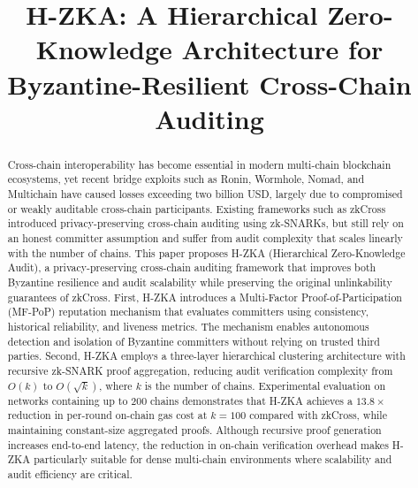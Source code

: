 \documentclass[journal]{IEEEtran}
\begin{document}
\title{H-ZKA: A Hierarchical Zero-Knowledge Architecture for Byzantine-Resilient Cross-Chain Auditing}



\maketitle

\begin{abstract}
Cross-chain interoperability has become essential in modern multi-chain blockchain ecosystems, yet recent bridge exploits such as Ronin, Wormhole, Nomad, and Multichain have caused losses exceeding two billion USD, largely due to compromised or weakly auditable cross-chain participants. Existing frameworks such as zkCross introduced privacy-preserving cross-chain auditing using zk-SNARKs, but still rely on an honest committer assumption and suffer from audit complexity that scales linearly with the number of chains. This paper proposes H-ZKA (Hierarchical Zero-Knowledge Audit), a privacy-preserving cross-chain auditing framework that improves both Byzantine resilience and audit scalability while preserving the original unlinkability guarantees of zkCross. First, H-ZKA introduces a Multi-Factor Proof-of-Participation (MF-PoP) reputation mechanism that evaluates committers using consistency, historical reliability, and liveness metrics. The mechanism enables autonomous detection and isolation of Byzantine committers without relying on trusted third parties. Second, H-ZKA employs a three-layer hierarchical clustering architecture with recursive zk-SNARK proof aggregation, reducing audit verification complexity from $O(k)$ to $O(\sqrt{k})$, where $k$ is the number of chains. Experimental evaluation on networks containing up to 200 chains demonstrates that H-ZKA achieves a $13.8\times$ reduction in per-round on-chain gas cost at $k=100$ compared with zkCross, while maintaining constant-size aggregated proofs. Although recursive proof generation increases end-to-end latency, the reduction in on-chain verification overhead makes H-ZKA particularly suitable for dense multi-chain environments where scalability and audit efficiency are critical.
\end{abstract}
\end{document}
